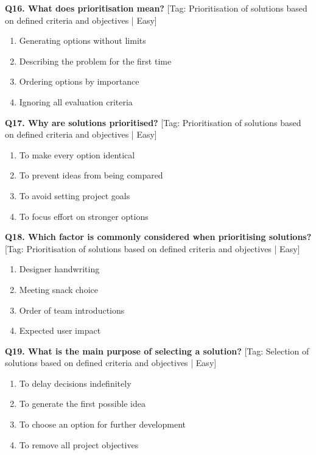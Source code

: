 \noindent\textbf{Q16. What does prioritisation mean?} \hfill [Tag: Prioritisation of solutions based on defined criteria and objectives | Easy]
\begin{enumerate}[label=(\alph*),topsep=2pt,itemsep=1pt,partopsep=0pt,parsep=0pt]
    \item {Generating options without limits}
    \item {Describing the problem for the first time}
    \item {Ordering options by importance}
    \item {Ignoring all evaluation criteria}
\end{enumerate}
\vspace{2mm}

\noindent\textbf{Q17. Why are solutions prioritised?} \hfill [Tag: Prioritisation of solutions based on defined criteria and objectives | Easy]
\begin{enumerate}[label=(\alph*),topsep=2pt,itemsep=1pt,partopsep=0pt,parsep=0pt]
    \item {To make every option identical}
    \item {To prevent ideas from being compared}
    \item {To avoid setting project goals}
    \item {To focus effort on stronger options}
\end{enumerate}
\vspace{2mm}

\noindent\textbf{Q18. Which factor is commonly considered when prioritising solutions?} \hfill [Tag: Prioritisation of solutions based on defined criteria and objectives | Easy]
\begin{enumerate}[label=(\alph*),topsep=2pt,itemsep=1pt,partopsep=0pt,parsep=0pt]
    \item {Designer handwriting}
    \item {Meeting snack choice}
    \item {Order of team introductions}
    \item {Expected user impact}
\end{enumerate}
\vspace{2mm}

\noindent\textbf{Q19. What is the main purpose of selecting a solution?} \hfill [Tag: Selection of solutions based on defined criteria and objectives | Easy]
\begin{enumerate}[label=(\alph*),topsep=2pt,itemsep=1pt,partopsep=0pt,parsep=0pt]
    \item {To delay decisions indefinitely}
    \item {To generate the first possible idea}
    \item {To choose an option for further development}
    \item {To remove all project objectives}
\end{enumerate}
\vspace{2mm}

